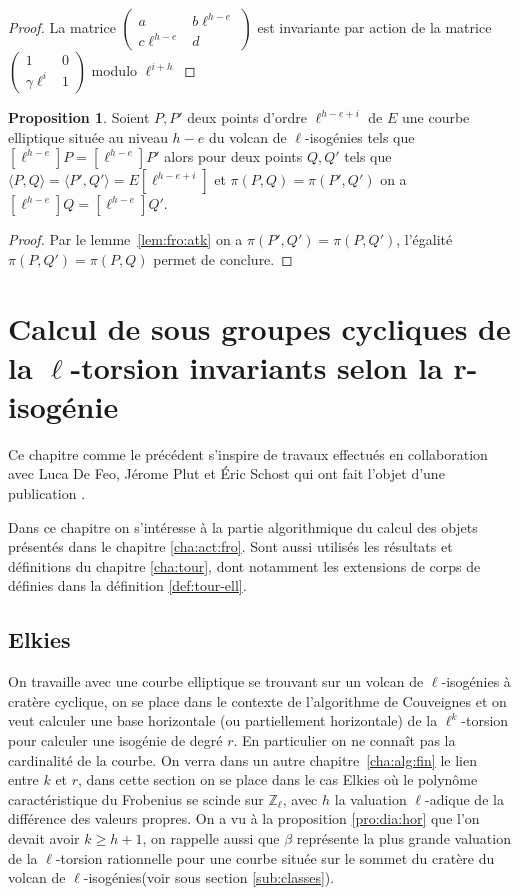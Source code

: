 \documentclass[10pt,a4paper]{book}
\theoremstyle{plain}
\theoremstyle{definition}
\theoremstyle{definition}
\theoremstyle{definition}
\newtheorem{prop}[thm]{Proposition}
\theoremstyle{definition}
\theoremstyle{remark}
\theoremstyle{remark}
\theoremstyle{definition}
\begin{document}
\begin{proof}
La matrice $\left( \begin{smallmatrix}a & b\ell^{h-e} \\c\ell^{h-e}  & d \end{smallmatrix} 
\right)$ est invariante par action de la matrice $\left( 
\begin{smallmatrix}1 & 0 \\\gamma\ell^{i}  & 1 \end{smallmatrix} 
\right)$ modulo $\ell^{i+h}$
\end{proof}

\begin{prop}
Soient $P,P'$ deux points d'ordre $\ell^{h-e+i}$ de $E$ une courbe elliptique 
située au niveau $h-e$ du volcan de $\ell$-isogénies tels que $[\ell^{h-e}]P=
[\ell^{h-e}]P'$ alors pour deux points $Q,Q'$ tels que $\langle P, Q \rangle = 
\langle P', Q' \rangle=E[\ell^{h-e+i}]$ et $\pi(P,Q)=\pi(P',Q')$ on a 
$[\ell^{h-e}]Q=[\ell^{h-e}]Q'$.
\end{prop}

\begin{proof}
Par le lemme~\ref{lem:fro:atk} on a $\pi(P',Q')=\pi(P,Q')$, l'égalité 
$\pi(P,Q')=\pi(P,Q)$ permet de conclure.
\end{proof}

\chapter{Calcul de sous groupes cycliques de la $\ell$-torsion invariants selon la r-isogénie}
\label{cha:con:poi}
Ce chapitre comme le précédent s'inspire de travaux effectués en collaboration avec Luca De Feo, J\'erome Plut et \'Eric Schost qui ont fait l'objet d'une publication \cite{Defeo_Plut_Schost_2016}.

Dans ce chapitre on s'intéresse à la partie algorithmique du calcul des objets présentés dans le chapitre \ref{cha:act:fro}. Sont aussi utilisés les résultats et définitions du chapitre \ref{cha:tour}, dont notamment les extensions de corps de définies dans la définition \ref{def:tour-ell}.

\section{Elkies}
On travaille avec une courbe elliptique se trouvant sur un volcan de $\ell$-isogénies à cratère cyclique, on se place dans le contexte de l'algorithme de Couveignes et on veut calculer une base horizontale (ou partiellement horizontale) de la $\ell^k$-torsion pour calculer une isogénie de degré $r$. En particulier on ne connaît pas la cardinalité de la courbe. On verra dans un autre chapitre~\ref{cha:alg:fin} le lien entre $k$ et $r$, dans cette section on se place dans le cas Elkies où le polynôme caractéristique du Frobenius se scinde sur $\mathbb{Z}_{\ell}$, avec $h$ la valuation $\ell$-adique de la différence des valeurs propres. On a vu à la proposition \ref{pro:dia:hor} que l'on devait avoir $k \geqslant h+1$, on rappelle aussi que $\beta$ représente la plus grande valuation de la $\ell$-torsion rationnelle pour une courbe située sur le sommet du cratère du volcan de $\ell$-isogénies(voir sous section \ref{sub:classes}).
\end{document}
